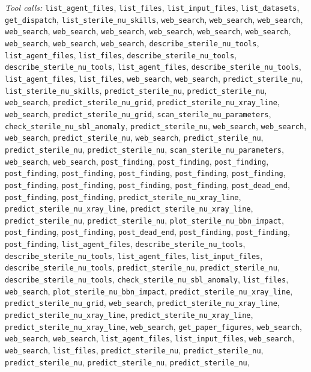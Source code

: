 \documentclass[11pt,a4paper]{article}
\begin{document}
\textit{Tool calls:} \texttt{list\_agent\_files}, \texttt{list\_files}, \texttt{list\_input\_files}, \texttt{list\_datasets}, \texttt{get\_dispatch}, \texttt{list\_sterile\_nu\_skills}, \texttt{web\_search}, \texttt{web\_search}, \texttt{web\_search}, \texttt{web\_search}, \texttt{web\_search}, \texttt{web\_search}, \texttt{web\_search}, \texttt{web\_search}, \texttt{web\_search}, \texttt{web\_search}, \texttt{web\_search}, \texttt{web\_search}, \texttt{describe\_sterile\_nu\_tools}, \texttt{list\_agent\_files}, \texttt{list\_files}, \texttt{describe\_sterile\_nu\_tools}, \texttt{describe\_sterile\_nu\_tools}, \texttt{list\_agent\_files}, \texttt{describe\_sterile\_nu\_tools}, \texttt{list\_agent\_files}, \texttt{list\_files}, \texttt{web\_search}, \texttt{web\_search}, \texttt{predict\_sterile\_nu}, \texttt{list\_sterile\_nu\_skills}, \texttt{predict\_sterile\_nu}, \texttt{predict\_sterile\_nu}, \texttt{web\_search}, \texttt{predict\_sterile\_nu\_grid}, \texttt{predict\_sterile\_nu\_xray\_line}, \texttt{web\_search}, \texttt{predict\_sterile\_nu\_grid}, \texttt{scan\_sterile\_nu\_parameters}, \texttt{check\_sterile\_nu\_sbl\_anomaly}, \texttt{predict\_sterile\_nu}, \texttt{web\_search}, \texttt{web\_search}, \texttt{web\_search}, \texttt{predict\_sterile\_nu}, \texttt{web\_search}, \texttt{predict\_sterile\_nu}, \texttt{predict\_sterile\_nu}, \texttt{predict\_sterile\_nu}, \texttt{scan\_sterile\_nu\_parameters}, \texttt{web\_search}, \texttt{web\_search}, \texttt{post\_finding}, \texttt{post\_finding}, \texttt{post\_finding}, \texttt{post\_finding}, \texttt{post\_finding}, \texttt{post\_finding}, \texttt{post\_finding}, \texttt{post\_finding}, \texttt{post\_finding}, \texttt{post\_finding}, \texttt{post\_finding}, \texttt{post\_finding}, \texttt{post\_dead\_end}, \texttt{post\_finding}, \texttt{post\_finding}, \texttt{predict\_sterile\_nu\_xray\_line}, \texttt{predict\_sterile\_nu\_xray\_line}, \texttt{predict\_sterile\_nu\_xray\_line}, \texttt{predict\_sterile\_nu}, \texttt{predict\_sterile\_nu}, \texttt{plot\_sterile\_nu\_bbn\_impact}, \texttt{post\_finding}, \texttt{post\_finding}, \texttt{post\_dead\_end}, \texttt{post\_finding}, \texttt{post\_finding}, \texttt{post\_finding}, \texttt{list\_agent\_files}, \texttt{describe\_sterile\_nu\_tools}, \texttt{describe\_sterile\_nu\_tools}, \texttt{list\_agent\_files}, \texttt{list\_input\_files}, \texttt{describe\_sterile\_nu\_tools}, \texttt{predict\_sterile\_nu}, \texttt{predict\_sterile\_nu}, \texttt{describe\_sterile\_nu\_tools}, \texttt{check\_sterile\_nu\_sbl\_anomaly}, \texttt{list\_files}, \texttt{web\_search}, \texttt{plot\_sterile\_nu\_bbn\_impact}, \texttt{predict\_sterile\_nu\_xray\_line}, \texttt{predict\_sterile\_nu\_grid}, \texttt{web\_search}, \texttt{predict\_sterile\_nu\_xray\_line}, \texttt{predict\_sterile\_nu\_xray\_line}, \texttt{predict\_sterile\_nu\_xray\_line}, \texttt{predict\_sterile\_nu\_xray\_line}, \texttt{web\_search}, \texttt{get\_paper\_figures}, \texttt{web\_search}, \texttt{web\_search}, \texttt{web\_search}, \texttt{list\_agent\_files}, \texttt{list\_input\_files}, \texttt{web\_search}, \texttt{web\_search}, \texttt{list\_files}, \texttt{predict\_sterile\_nu}, \texttt{predict\_sterile\_nu}, \texttt{predict\_sterile\_nu}, \texttt{predict\_sterile\_nu}, \texttt{predict\_sterile\_nu}, 
\end{document}
